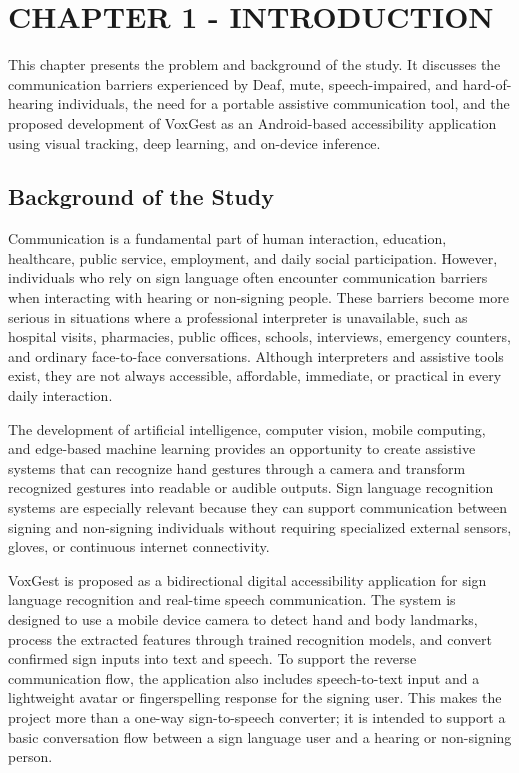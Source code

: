 
\pagestyle{plain}
\setcounter{page}{1}

\chapter{\uppercase {\textbf{CHAPTER 1 - Introduction}}}

This chapter presents the problem and background of the study. It discusses the communication barriers experienced by Deaf, mute, speech-impaired, and hard-of-hearing individuals, the need for a portable assistive communication tool, and the proposed development of VoxGest as an Android-based accessibility application using visual tracking, deep learning, and on-device inference.

\section{Background of the Study}

Communication is a fundamental part of human interaction, education, healthcare, public service, employment, and daily social participation. However, individuals who rely on sign language often encounter communication barriers when interacting with hearing or non-signing people. These barriers become more serious in situations where a professional interpreter is unavailable, such as hospital visits, pharmacies, public offices, schools, interviews, emergency counters, and ordinary face-to-face conversations. Although interpreters and assistive tools exist, they are not always accessible, affordable, immediate, or practical in every daily interaction.

The development of artificial intelligence, computer vision, mobile computing, and edge-based machine learning provides an opportunity to create assistive systems that can recognize hand gestures through a camera and transform recognized gestures into readable or audible outputs. Sign language recognition systems are especially relevant because they can support communication between signing and non-signing individuals without requiring specialized external sensors, gloves, or continuous internet connectivity.

VoxGest is proposed as a bidirectional digital accessibility application for sign language recognition and real-time speech communication. The system is designed to use a mobile device camera to detect hand and body landmarks, process the extracted features through trained recognition models, and convert confirmed sign inputs into text and speech. To support the reverse communication flow, the application also includes speech-to-text input and a lightweight avatar or fingerspelling response for the signing user. This makes the project more than a one-way sign-to-speech converter; it is intended to support a basic conversation flow between a sign language user and a hearing or non-signing person.

